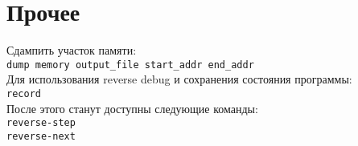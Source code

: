 \section{Прочее}

\noindent Сдампить участок памяти: \\
\indent \texttt{dump memory output\_file start\_addr end\_addr} \\


\noindent Для использования reverse debug и сохранения состояния программы: \\
\indent \texttt{record} \\
\noindent После этого станут доступны следующие команды: \\
\indent \texttt{reverse-step} \\
\indent \texttt{reverse-next}

